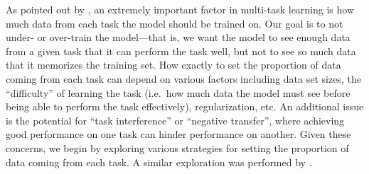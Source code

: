 \documentclass[twoside,11pt]{article}
\begin{document}
As pointed out by \cite{arivazhagan2019massively}, an extremely important factor in multi-task learning is how much data from each task the model should be trained on.
Our goal is to not under- or over-train the model---that is, we want the model to see enough data from a given task that it can perform the task well, but not to see so much data that it memorizes the training set.
How exactly to set the proportion of data coming from each task can depend on various factors including data set sizes, the ``difficulty'' of learning the task (i.e.\ how much data the model must see before being able to perform the task effectively), regularization, etc.
An additional issue is the potential for ``task interference'' or ``negative transfer'', where achieving good performance on one task can hinder performance on another.
Given these concerns, we begin by exploring various strategies for setting the proportion of data coming from each task.
A similar exploration was performed by \cite{wang2019can}.
\end{document}
